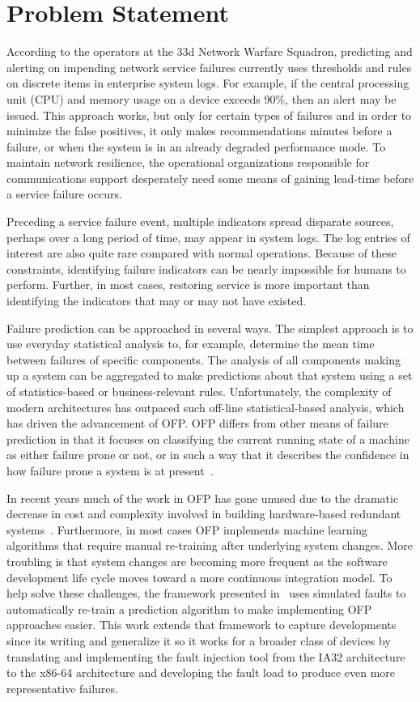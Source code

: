 \section{Problem Statement}
According to the operators at the 33d Network Warfare Squadron, predicting and
alerting on impending network service failures currently uses thresholds and
rules on discrete items in enterprise system logs.  For example, if the central
processing unit (CPU) and memory usage on a device exceeds 90\%, then an alert
may be issued.  This approach works, but only for certain types of failures and
in order to minimize the false positives, it only makes recommendations minutes
before a failure, or when the system is in an already degraded performance
mode.  To maintain network resilience, the operational organizations
responsible for communications support desperately need some means of gaining
lead-time before a service failure occurs.  

Preceding a service failure event, multiple indicators spread disparate
sources, perhaps over a long period of time, may appear in system logs.  The
log entries of interest are also quite rare compared with normal operations.
Because of these constraints, identifying failure indicators can be nearly
impossible for humans to perform.  Further, in most cases, restoring service is
more important than identifying the indicators that may or may not have
existed.  

Failure prediction can be approached in several ways. The simplest approach is
to use everyday statistical analysis to, for example, determine the mean time
between failures of specific components. The analysis of all components making
up a system can be aggregated to make predictions about that system using a set
of statistics-based or business-relevant rules.  Unfortunately, the complexity
of modern architectures has outpaced such off-line statistical-based analysis,
which has driven the advancement of OFP.  OFP differs from other means of
failure prediction in that it focuses on classifying the current running state
of a machine as either failure prone or not, or in such a way that it describes
the confidence in how failure prone a system is at
present~\cite{salfnerSurvey}.

In recent years much of the work in OFP has gone unused due to the dramatic
decrease in cost and complexity involved in building hardware-based redundant
systems~\cite{irrera2015}.  Furthermore, in most cases OFP implements machine
learning algorithms that require manual re-training after underlying system
changes.  More troubling is that system changes are becoming more frequent as
the software development life cycle moves toward a more continuous integration
model.  To help solve these challenges, the framework presented
in~\cite{irrera2015} uses simulated faults to automatically re-train a
prediction algorithm to make implementing OFP approaches easier.  This work
extends that framework to capture developments since its writing and generalize
it so it works for a broader class of devices by translating and implementing
the fault injection tool from the IA32 architecture to the x86-64 architecture
and developing the fault load to produce even more representative failures.

